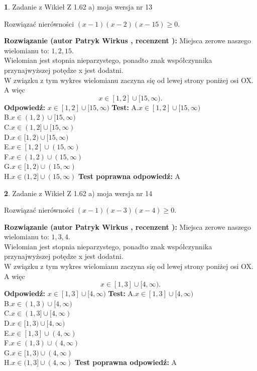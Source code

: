 \documentclass[12pt, a4paper]{article}
\theoremstyle{definition} %
\newtheorem{zad}{}
\newcommand{\zadStart}[1]{\begin{zad}#1\newline}
\newcommand{\zadStop}{\end{zad}}
\newcommand{\rozwStart}[2]{\noindent \textbf{Rozwiązanie (autor #1 , recenzent #2): }\newline}
\newcommand{\rozwStop}{\newline}
\newcommand{\odpStart}{\noindent \textbf{Odpowiedź:}\newline}
\newcommand{\odpStop}{\newline}
\newcommand{\testStart}{\noindent \textbf{Test:}\newline}
\newcommand{\testStop}{\newline}
\newcommand{\kluczStart}{\noindent \textbf{Test poprawna odpowiedź:}\newline}
\newcommand{\kluczStop}{\newline}
\begin{document}
\zadStart{Zadanie z Wikieł Z 1.62 a) moja wersja nr 13}

Rozwiązać nierówności $(x-1)(x-2)(x-15)\ge0$.
\zadStop
\rozwStart{Patryk Wirkus}{}
Miejsca zerowe naszego wielomianu to: $1, 2, 15$.\\
Wielomian jest stopnia nieparzystego, ponadto znak współczynnika przy\linebreak najwyższej potędze x jest dodatni.\\ W związku z tym wykres wielomianu zaczyna się od lewej strony poniżej osi OX. A więc $$x \in [1,2] \cup [15,\infty).$$
\rozwStop
\odpStart
$x \in [1,2] \cup [15,\infty)$
\odpStop
\testStart
A.$x \in [1,2] \cup [15,\infty)$\\
B.$x \in (1,2) \cup [15,\infty)$\\
C.$x \in (1,2] \cup [15,\infty)$\\
D.$x \in [1,2) \cup [15,\infty)$\\
E.$x \in [1,2] \cup (15,\infty)$\\
F.$x \in (1,2) \cup (15,\infty)$\\
G.$x \in [1,2) \cup (15,\infty)$\\
H.$x \in (1,2] \cup (15,\infty)$
\testStop
\kluczStart
A
\kluczStop



\zadStart{Zadanie z Wikieł Z 1.62 a) moja wersja nr 14}

Rozwiązać nierówności $(x-1)(x-3)(x-4)\ge0$.
\zadStop
\rozwStart{Patryk Wirkus}{}
Miejsca zerowe naszego wielomianu to: $1, 3, 4$.\\
Wielomian jest stopnia nieparzystego, ponadto znak współczynnika przy\linebreak najwyższej potędze x jest dodatni.\\ W związku z tym wykres wielomianu zaczyna się od lewej strony poniżej osi OX. A więc $$x \in [1,3] \cup [4,\infty).$$
\rozwStop
\odpStart
$x \in [1,3] \cup [4,\infty)$
\odpStop
\testStart
A.$x \in [1,3] \cup [4,\infty)$\\
B.$x \in (1,3) \cup [4,\infty)$\\
C.$x \in (1,3] \cup [4,\infty)$\\
D.$x \in [1,3) \cup [4,\infty)$\\
E.$x \in [1,3] \cup (4,\infty)$\\
F.$x \in (1,3) \cup (4,\infty)$\\
G.$x \in [1,3) \cup (4,\infty)$\\
H.$x \in (1,3] \cup (4,\infty)$
\testStop
\kluczStart
A
\kluczStop
\end{document}
